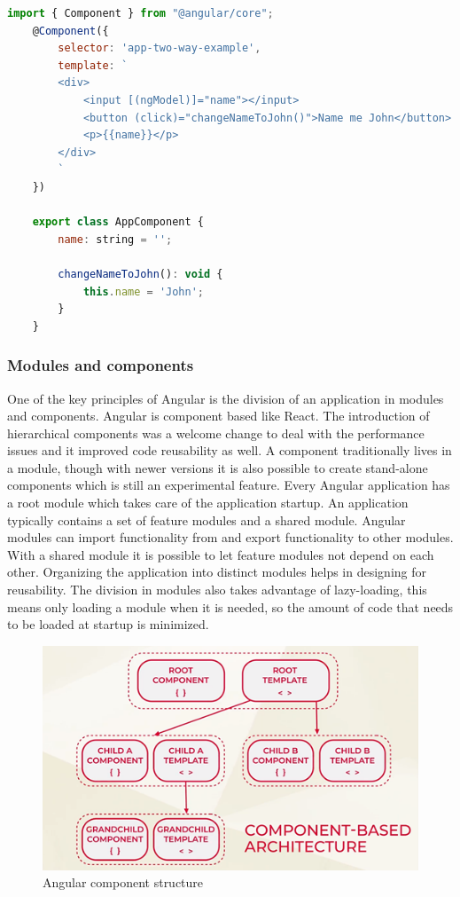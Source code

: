 \begin{lstlisting}[language=Javascript]
	import { Component } from "@angular/core";
	@Component({
		selector: 'app-two-way-example',
		template: `
		<div>
			<input [(ngModel)]="name"></input>
			<button (click)="changeNameToJohn()">Name me John</button>
			<p>{{name}}</p>
		</div>
		`
	})
	
	export class AppComponent {
		name: string = '';
		
		changeNameToJohn(): void {
			this.name = 'John';
		}
	}
\end{lstlisting}


\subsubsection{Modules and components}
One of the key principles of Angular is the division of an application in modules and components.
Angular is component based like React. The introduction of hierarchical components was a welcome change to deal with the performance issues and it improved code reusability as well. A component traditionally lives in a module, though with newer versions it is also possible to create stand-alone components which is still an experimental feature.
Every Angular application has a root module which takes care of the application startup. An application typically contains a set of feature modules and a shared module. Angular modules can import functionality from and export functionality to other modules. With a shared module it is possible to let feature modules not depend on each other. Organizing the application into distinct modules helps in designing for reusability. The division in modules also takes advantage of lazy-loading, this means only loading a module when it is needed, so the amount of code that needs to be loaded at startup is minimized. 
\autocite{Angular.io}

\begin{figure}[h!]
    \caption{Angular component structure}
    \centering
    \includegraphics[width=\textwidth]{img/angularcomponent.png} 
\end{figure}

